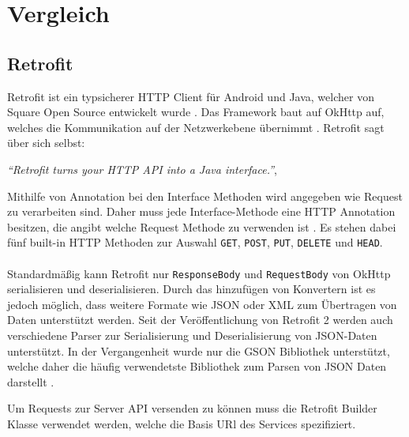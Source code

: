 \chapter{Vergleich}
\label{sec:comparison}

\section{Retrofit}
Retrofit ist ein typsicherer HTTP Client für Android und Java, welcher von Square Open Source entwickelt wurde \cite{retrofit}. Das Framework baut auf OkHttp auf, welches die Kommunikation auf der Netzwerkebene übernimmt \cite{okhttp}. Retrofit sagt über sich selbst:

\begin{center}
	\textit{\textquotedblleft Retrofit turns your HTTP API into a Java interface.\textquotedblright}, \cite[Webseite von Retrofit]{retrofit} 
	\\
\end{center}

Mithilfe von Annotation bei den Interface Methoden wird angegeben wie Request zu verarbeiten sind. Daher muss jede Interface-Methode eine HTTP Annotation besitzen, die angibt welche Request Methode zu verwenden ist \cite{retrofit}. Es stehen dabei fünf built-in HTTP Methoden zur Auswahl \texttt{GET}, \texttt{POST}, \texttt{PUT}, \texttt{DELETE} und \texttt{HEAD}.
\\\\
Standardmäßig kann Retrofit nur \texttt{ResponseBody} und \texttt{RequestBody} von OkHttp serialisieren und deserialisieren. Durch das hinzufügen von Konvertern ist es jedoch möglich, dass weitere Formate wie JSON oder XML zum Übertragen von Daten unterstützt werden. Seit der Veröffentlichung von Retrofit 2 werden auch verschiedene Parser zur Serialisierung und Deserialisierung von JSON-Daten unterstützt. In der Vergangenheit wurde nur die GSON Bibliothek unterstützt, welche daher die häufig verwendetste Bibliothek zum Parsen von JSON Daten darstellt \cite{consumingRetrofit}.

Um Requests zur Server API versenden zu können muss die Retrofit Builder Klasse verwendet werden, welche die Basis URl des Services spezifiziert.

